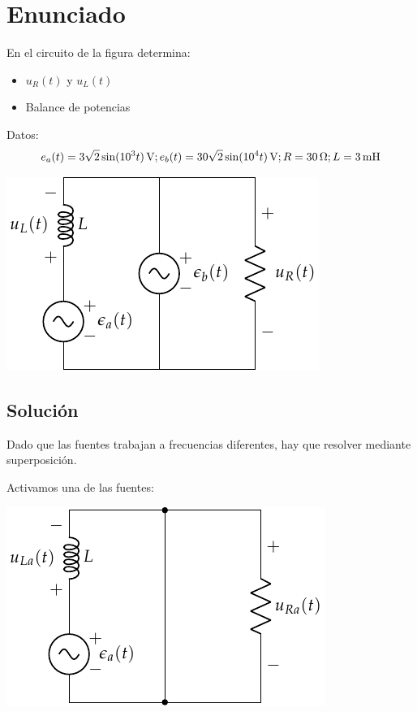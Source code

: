 
\section{Enunciado}
En el circuito de la figura determina:
\begin{itemize}
\item $u_R(t)$ y $u_L(t)$
\item Balance de potencias
\end{itemize}
Datos:
\begin{equation*}
  e_a(t) = \qty[parse-numbers=false]{3\sqrt{2} \sin(10^3 t)}{\volt}; e_b(t) = \qty[parse-numbers=false]{30\sqrt{2} \sin(10^4 t)}{\volt}; R = \qty{30}{\ohm}; L = \qty{3}{\milli\henry} 
\end{equation*}

\begin{center}
  \includegraphics{figuras/superposicion2_ej.pdf}
\end{center}

\subsection*{Solución}

Dado que las fuentes trabajan a frecuencias diferentes, hay que resolver mediante superposición.

Activamos una de las fuentes:
\begin{center}
\includegraphics{figuras/superposicion2_A}
\end{center}

